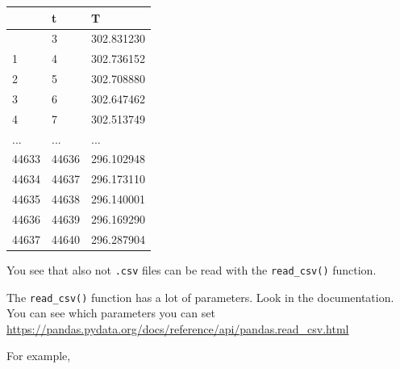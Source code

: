 \documentclass[
  letterpaper,
  DIV=11,
  numbers=noendperiod]{scrreprt}
\begin{document}
\begin{longtable}[]{@{}lll@{}}
\toprule\noalign{}
& t & T \\
\midrule\noalign{}
\endhead
\bottomrule\noalign{}
\endlastfoot
0 & 3 & 302.831230 \\
1 & 4 & 302.736152 \\
2 & 5 & 302.708880 \\
3 & 6 & 302.647462 \\
4 & 7 & 302.513749 \\
... & ... & ... \\
44633 & 44636 & 296.102948 \\
44634 & 44637 & 296.173110 \\
44635 & 44638 & 296.140001 \\
44636 & 44639 & 296.169290 \\
44637 & 44640 & 296.287904 \\
\end{longtable}

You see that also not \texttt{.csv} files can be read with the
\texttt{read\_csv()} function.

The \texttt{read\_csv()} function has a lot of parameters. Look in the
documentation. You can see which parameters you can set
\url{https://pandas.pydata.org/docs/reference/api/pandas.read_csv.html}

For example,
\end{document}
